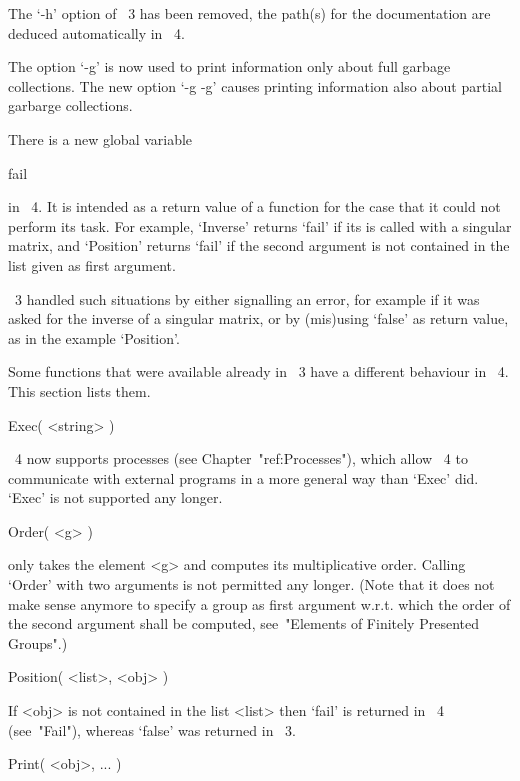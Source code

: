 The `-h' option of {\GAP}~3 has been removed,
the path(s) for the documentation are deduced automatically in {\GAP}~4.

The option `-g' is now used to print information only about full garbage
collections.
The new option `-g -g' causes printing information also about partial
garbarge collections.



There is a new global variable

\)fail


in {\GAP}~4.
It is intended as a return value of a function for the case that it
could not perform its task.
For example, `Inverse' returns `fail' if its is called with a singular
matrix, and `Position' returns `fail' if the second argument is not
contained in the list given as first argument.

{\GAP}~3 handled such situations by either signalling an error,
for example if it was asked for the inverse of a singular matrix,
or by (mis)using `false' as return value, as in the example `Position'.



Some functions that were available already in {\GAP}~3 have a different
behaviour in {\GAP}~4.  This section lists them.

\>Exec( <string> )

{\GAP}~4 now supports processes (see Chapter~"ref:Processes"),
which allow {\GAP}~4 to communicate with external programs in a more
general way than `Exec' did.
`Exec' is not supported any longer.

\>Order( <g> )

only takes the element <g> and computes its multiplicative order.
Calling `Order' with two arguments is not permitted any longer.
(Note that it does not make sense anymore to specify a group as
first argument w.r.t. which the order of the second argument shall
be computed, see~"Elements of Finitely Presented Groups".)

\>Position( <list>, <obj> )

If <obj> is not contained in the list <list> then `fail' is returned
in {\GAP}~4 (see~"Fail"), whereas `false' was returned in {\GAP}~3.

\>Print( <obj>, ... )


